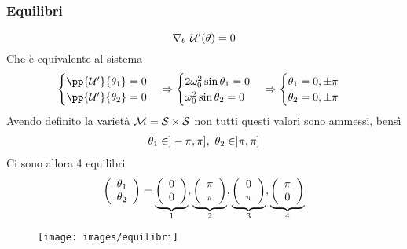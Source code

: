 \documentclass[Main.tex]{subfiles}
\begin{document}
\begin{tema}
\subsubsection*{Equilibri}
\begin{equation}
	\nabla_\theta \ \U'(\theta) =0 
\end{equation}
Che è equivalente al sistema
\begin{gather}
	\begin{cases}
		\pp{\U'}{\theta_1} =0 \\
		\pp{\U'}{\theta_2}=0 
	\end{cases} \Rightarrow \begin{cases}
 	2 \omega_0^2 \sin \theta_1 = 0\\
 	\omega^2_0 \sin \theta_2 =0
 \end{cases} \Rightarrow \begin{cases}
 	\theta_1 =0, \pm \pi\\
 	\theta_2 =0 , \pm \pi
 \end{cases}
\end{gather}
Avendo definito la varietà $\M= \S \times \S$ non tutti questi valori sono ammessi, bensì
\begin{gather}
	\theta_1 \in ] - \pi , \pi] , \ \theta _2 \in ] \- \pi , \pi]
\end{gather}
Ci sono allora 4 equilibri 
\begin{gather}
	\vec{\theta_1 \\ \theta_2} = \underbrace{ \vec{0 \\ 0}}_{1} , \underbrace{ \vec{\pi \\ \pi}}_{2} , \underbrace{\vec{ 0 \\ \pi} }_{3} , \underbrace{\vec{ \pi \\ 0} } _4
\end{gather}
\begin{figure}[H]
    \centering
  \texttt{[image: images/equilibri]}
\end{figure}


\end{tema}
\end{document}
